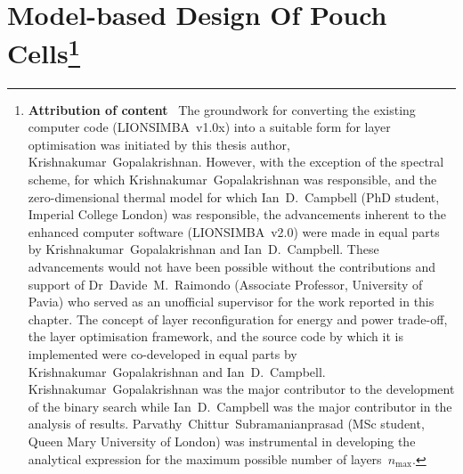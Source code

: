 
\newpage
\thispagestyle{plain} %
\mbox{}
\graphicspath{{chapters/layer_opt/figures/}}

\chapter[Model-based Design of Pouch Cells]{%
    Model-based  Design Of  Pouch Cells\footnote{\textbf{Attribution  of content}  \
        The  groundwork  for converting  the  existing  computer code  (LIONSIMBA~v1.0x)
        into  a suitable  form  for  layer optimisation  was  initiated  by this  thesis
        author, \mbox{Krishnakumar  Gopalakrishnan}. However, with the  exception of the
        spectral scheme,  for which \mbox{Krishnakumar Gopalakrishnan}  was responsible,
        and  the  zero-dimensional  thermal  model for  which  \mbox{Ian  D.\  Campbell}
        (PhD  student,  Imperial  College  London)  was  responsible,  the  advancements
        inherent to the  enhanced computer software (LIONSIMBA~v2.0) were  made in equal
        parts by  \mbox{Krishnakumar Gopalakrishnan} and \mbox{Ian  D.\ Campbell}. These
        advancements would not have been  possible without the contributions and support
        of \mbox{Dr~Davide M.~Raimondo} (Associate  Professor, University of Pavia) who
        served as  an unofficial supervisor for  the work reported in  this chapter. The
        concept  of layer  reconfiguration for  energy  and power  trade-off, the  layer
        optimisation  framework,  and  the  source  code  by  which  it  is  implemented
        were  co-developed  in equal  parts  by  \mbox{Krishnakumar Gopalakrishnan}  and
        \mbox{Ian  D.\  Campbell}.  \mbox{Krishnakumar  Gopalakrishnan}  was  the  major
        contributor  to  the  development  of  the binary  search  while  \mbox{Ian  D.\
            Campbell} was the  major contributor in the analysis  of results. \mbox{Parvathy
        Chittur Subramanianprasad}  (MSc student, Queen  Mary University of  London) was
        instrumental in  developing the analytical  expression for the  maximum possible
    number of layers~$n_\text{max}$.}%
}\label{ch:modelbaseddesign}

\vspace*{-1em}
\renewcommand{\baselinestretch}{1.0}\normalsize %
\startcontents[chapters]
\printcontents[chapters]{}{1}{\setcounter{tocdepth}{1}}

